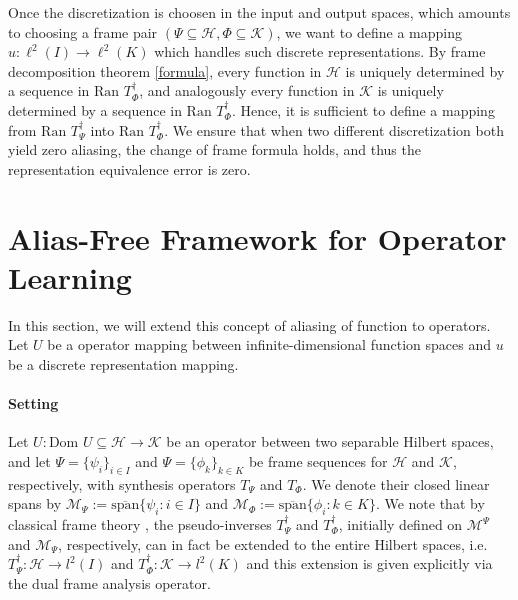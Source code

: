 \documentclass[reqno,10pt]{amsart}
\theoremstyle{plain}
\theoremstyle{definition}
\newcommand{\cal}[1]{\mathcal{#1}}
\begin{document}
    Once the discretization is choosen in the input and output spaces, which amounts to choosing a frame pair $(\Psi \subseteq \cal H,\Phi \subseteq \cal K)$, we want to define a mapping $u : \ell^2(I) \to \ell^2(K)$ which handles such discrete representations. By frame decomposition theorem \ref{formula}, every function in $\cal H$ is uniquely determined by a sequence in $\text{Ran } T^\dag_\Phi$, and analogously every function in $\cal K$ is uniquely determined by a sequence in $\text{Ran }T^\dag_\Phi$. Hence, it is sufficient to define a mapping from $\text{Ran }T^\dag_\Psi$ into $\text{Ran }T^\dag_\Phi$. We ensure that when two different discretization both yield zero aliasing, the change of frame formula holds, and thus the representation equivalence error is zero.



    \section{\bf Alias-Free Framework for Operator Learning} \label{appendix:C}
    \noindent In this section, we will extend this concept of aliasing of function to operators. Let $U$ be a operator mapping between infinite-dimensional function spaces and $u$ be a discrete representation mapping.
    
    \paragraph{\bf Setting}Let $U: \text{Dom }U \subseteq \cal H \to \cal K$ be an operator between two separable Hilbert spaces, and let $\Psi = \{\psi_i\}_{i\in I}$ and $\Psi = \{\phi_k\}_{k \in K}$ be frame sequences for $\cal H$ and $\cal K$, respectively, with synthesis operators $T_\Psi$ and $T_\Phi$. We denote their closed linear spans by $\cal M_\Psi := \overline{\text{span}}\{\psi_i : i \in I\}$ and $\cal M_\Phi := \overline{\text{span}}\{\phi_i : k \in K\}$. We note that by classical frame theory \cite{Christensen2008-gk}, the pseudo-inverses $T_\Psi^\dag$ and $T_\Phi^\dag$, initially defined on $\cal M^\Psi$ and $\cal M_\Psi$, respectively, can in fact be extended to the entire Hilbert spaces, i.e. $T_\Psi^\dag : \cal H \to l^2(I)$ and $T_\Phi^\dag : \cal K \to l^2(K)$ and this extension is given explicitly via the dual frame analysis operator.
\end{document}
